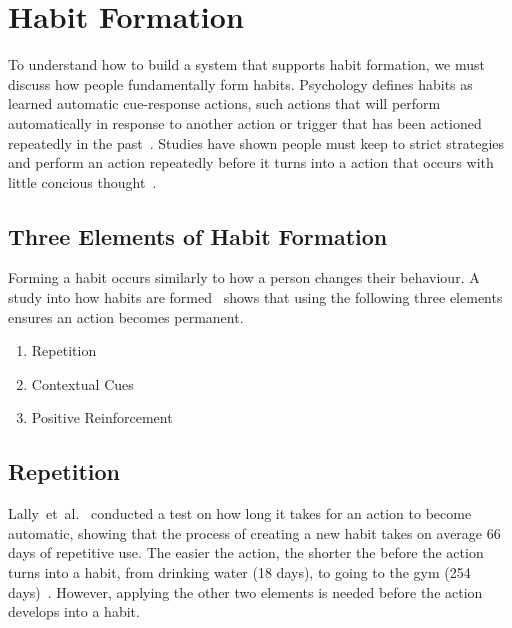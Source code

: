 \newpage

\section{Habit Formation}
To understand how to build a system that supports habit formation, we must discuss how people fundamentally form habits.\newline
\newline
Psychology defines habits as learned automatic cue-response actions, such actions that will perform automatically in response to another action or trigger that has been actioned repeatedly in the past~\cite{article_the_habitual_consumer}. Studies have shown people must keep to strict strategies and perform an action repeatedly before it turns into a action that occurs with little concious thought~\cite{article_promoting_habit_formation}.

\subsection{Three Elements of Habit Formation}
Forming a habit occurs similarly to how a person changes their behaviour. A study into how habits are formed~\cite{article_experiences_of_habit_formation} shows that using the following three elements ensures an action becomes permanent.

\begin{enumerate}
  \item Repetition
  \item Contextual Cues
  \item Positive Reinforcement
\end{enumerate}

\subsection*{Repetition}
Lally~et~al.~\cite{article_how_habits_formed_modelling_habit_formation} conducted a test on how long it takes for an action to become automatic, showing that the process of creating a new habit takes on average 66 days of repetitive use. The easier the action, the shorter the before the action turns into a habit, from drinking water (18 days), to going to the gym (254 days)~\cite{article_how_habits_formed_modelling_habit_formation}. However, applying the other two elements is needed before the action develops into a habit.

